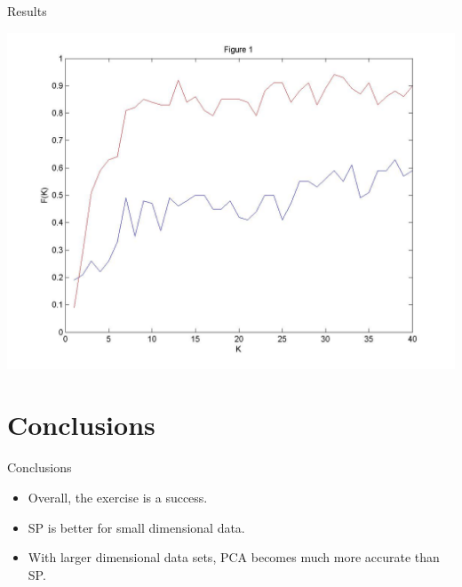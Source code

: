 \documentclass[pdf]{beamer}
\begin{document}
\begin{frame}{Results}
\begin{center}
\includegraphics[scale=.22]{figure1}
\end{center}
\end{frame}

\section{Conclusions}
\begin{frame}{Conclusions}
\begin{itemize}
\item Overall, the exercise is a success.
\item SP is better for small dimensional data.
\item With larger dimensional data sets, PCA becomes much more accurate than SP.
\end{itemize}
\end{frame}
\end{document}
